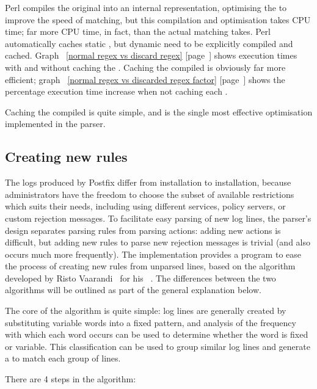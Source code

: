 \documentclass[a4paper,12pt,draft]{article}
\newcommand{\refwithpage}[1]{%
    \empty{}\ref{#1} [page~\pageref{#1}]%
}
\begin{document}
Perl compiles the original \regex{} into an internal representation,
optimising the \regex{} to improve the speed of matching, but this
compilation and optimisation takes CPU time; far more CPU time, in fact,
than the actual matching takes.  Perl automatically caches static
\regexes{}, but dynamic \regexes{} need to be explicitly compiled and
cached.  Graph~\refwithpage{normal regex vs discard regex} shows execution
times with and without caching the \regex{}.  Caching the compiled
\regexes{} is obviously far more efficient; graph~\refwithpage{normal regex
vs discarded regex factor} shows the percentage execution time increase
when not caching each \regex{}.

Caching the compiled \regexes{} is quite simple, and is the single most
effective optimisation implemented in the parser.

\subsection{Creating new rules}

\label{creating new rules}

The logs produced by Postfix differ from installation to installation,
because administrators have the freedom to choose the subset of available
restrictions which suits their needs, including using different \RBL{}
services, policy servers, or custom rejection messages.  To facilitate easy
parsing of new log lines, the parser's design separates parsing rules from
parsing actions: adding new actions is difficult, but adding new rules to
parse new rejection messages is trivial (and also occurs much more
frequently).  The implementation provides a program to ease the process of
creating new rules from unparsed lines, based on the algorithm developed by
Risto Vaarandi~\cite{risto-vaarandi} for his \SLCT{}~\cite{slct-paper}.
The differences between the two algorithms will be outlined as part of the
general explanation below.

The core of the algorithm is quite simple: log lines are generally created
by substituting variable words into a fixed pattern, and analysis of the
frequency with which each word occurs can be used to determine whether the
word is fixed or variable.  This classification can be used to group
similar log lines and generate a \regex{} to match each group of lines.

There are 4 steps in the algorithm:
\end{document}
